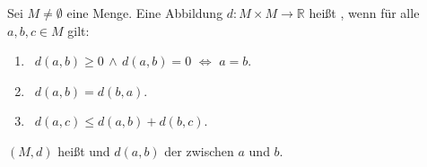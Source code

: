 Sei $M \neq \emptyset$ eine Menge. Eine Abbildung $d: M \times M \to \mathbb{R}$ heißt , wenn für alle $a, b, c \in M$ gilt:
\begin{enumerate}[label="",leftmargin=*]
    \item {} \, $d(a, b) \geq 0 \, \land \, d(a, b) = 0$ $\Leftrightarrow$ $a=b$.
    \item {} \, $d(a, b) = d(b, a)$.
    \item {} \, $d(a, c) \leq d(a, b) + d(b, c)$.
\end{enumerate}
$(M, d)$ heißt  und $d(a, b)$ der  zwischen $a$ und $b$.